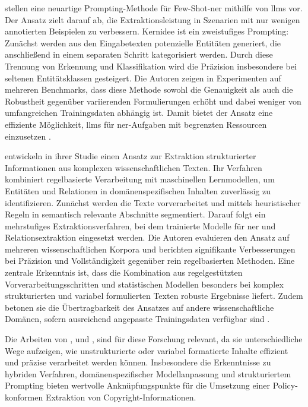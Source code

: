 \citeauthor{cheng_novel_2024} \autocite{cheng_novel_2024} stellen eine neuartige Prompting-Methode für Few-Shot-\gls{ner} mithilfe von \glspl{llm} vor.
Der Ansatz zielt darauf ab, die Extraktionsleistung in Szenarien mit nur wenigen annotierten Beispielen zu verbessern.
Kernidee ist ein zweistufiges Prompting: Zunächst werden aus den Eingabetexten potenzielle Entitäten generiert, die anschließend in einem separaten Schritt kategorisiert werden.
Durch diese Trennung von Erkennung und Klassifikation wird die Präzision insbesondere bei seltenen Entitätsklassen gesteigert.
Die Autoren zeigen in Experimenten auf mehreren Benchmarks, dass diese Methode sowohl die Genauigkeit als auch die Robustheit gegenüber variierenden Formulierungen erhöht und dabei weniger von umfangreichen Trainingsdaten abhängig ist.
Damit bietet der Ansatz eine effiziente Möglichkeit, \glspl{llm} für \gls{ner}-Aufgaben mit begrenzten Ressourcen einzusetzen \autocite{cheng_novel_2024}.

\citeauthor{dunn_structured_2022} \autocite{dunn_structured_2022} entwickeln in ihrer Studie einen Ansatz zur Extraktion strukturierter Informationen aus komplexen wissenschaftlichen Texten.
Ihr Verfahren kombiniert regelbasierte Verarbeitung mit maschinellen Lernmodellen, um Entitäten und Relationen in domänenspezifischen Inhalten zuverlässig zu identifizieren.
Zunächst werden die Texte vorverarbeitet und mittels heuristischer Regeln in semantisch relevante Abschnitte segmentiert.
Darauf folgt ein mehrstufiges Extraktionsverfahren, bei dem trainierte Modelle für \gls{ner} und Relationsextraktion eingesetzt werden.
Die Autoren evaluieren den Ansatz auf mehreren wissenschaftlichen Korpora und berichten signifikante Verbesserungen bei Präzision und Vollständigkeit gegenüber rein regelbasierten Methoden.
Eine zentrale Erkenntnis ist, dass die Kombination aus regelgestützten Vorverarbeitungsschritten und statistischen Modellen besonders bei komplex strukturierten und variabel formulierten Texten robuste Ergebnisse liefert.
Zudem betonen sie die Übertragbarkeit des Ansatzes auf andere wissenschaftliche Domänen, sofern ausreichend angepasste Trainingsdaten verfügbar sind \autocite{dunn_structured_2022}.

Die Arbeiten von \citeauthor{breton_empowering_2024} \autocite{breton_empowering_2024}, \citeauthor{cheng_novel_2024} \autocite{cheng_novel_2024} und \citeauthor{dunn_structured_2022} \autocite{dunn_structured_2022}, sind für diese Forschung relevant, da sie unterschiedliche Wege aufzeigen, wie unstrukturierte oder variabel formatierte Inhalte effizient und präzise verarbeitet werden können.
Insbesondere die Erkenntnisse zu hybriden Verfahren, domänenspezifischer Modellanpassung und strukturiertem Prompting bieten wertvolle Anknüpfungspunkte für die Umsetzung einer Policy-konformen Extraktion von Copyright-Informationen.